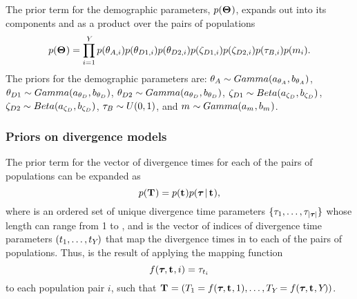 \begin{linenomath}
The prior term for the demographic parameters, $p(\mathbf{\Theta_{}})$,
expands out into its components and as a product over the \npairs{}
pairs of populations
\begin{equation}
    p(\demographicParamVector) =
    \prod_{i=1}^{\npairs{}}
    p(\ancestralTheta{i})
    p(\descendantTheta{1}{i})
    p(\descendantTheta{2}{i})
    p(\bottleScalar{1}{i})
    p(\bottleScalar{2}{i})
    p(\bottleTime{i})
    p(\migrationRate{i}).
    \label{eq:demographicPrior}
\end{equation}
The priors for the demographic parameters are:
$\ancestralTheta{} \sim Gamma(\gammaShape{\ancestralTheta{}},
\gammaScale{\ancestralTheta{}})$,
$\descendantTheta{1}{} \sim Gamma(\gammaShape{\descendantTheta{}{}},
\gammaScale{\descendantTheta{}{}})$,
$\descendantTheta{2}{} \sim Gamma(\gammaShape{\descendantTheta{}{}},
\gammaScale{\descendantTheta{}{}})$,
$\bottleScalar{1}{} \sim Beta(\betaA{\bottleScalar{}{}},
\betaB{\bottleScalar{}{}})$,
$\bottleScalar{2}{} \sim Beta(\betaA{\bottleScalar{}{}},
\betaB{\bottleScalar{}{}})$,
$\bottleTime{} \sim U(0, 1)$,
and
$m_{} \sim Gamma(a_{m_{}},
b_{m_{}})$.
\end{linenomath}

\subsubsection*{Priors on divergence models}
\begin{linenomath}
The prior term for the vector of divergence times for each of
the \npairs{} pairs of populations can be expanded as
\begin{equation}
    p(\mathbf{T_{}}) = p(\mathbf{t_{}})p(\boldsymbol{\tau_{}} \,|\, \mathbf{t_{}}),
    \label{eq:divModelPrior}
\end{equation}
where \divTimeVector is an ordered set of unique divergence time parameters
$\{\tau_{1}, \ldots, \tau_{\lvert \boldsymbol{\tau_{}} \rvert}\}$ whose length
\divTimeNum can range from 1 to \npairs{},
and \divTimeIndexVector is the vector of indices of divergence time parameters 
$(t_{1}, \ldots, t_{Y_{}})$
that map the divergence times in \divTimeVector to each of the \npairs{}
pairs of populations.
Thus, \divTimeMapVector is the result of applying the mapping function
\begin{equation}
    f(\boldsymbol{\tau_{}}, \mathbf{t_{}}, i) = \tau_{t_{i}}
    \label{eq:divTimeMapFunction}
\end{equation}
to each population pair $i$, such that
$\mathbf{T_{}} = (T_{1} = f(\boldsymbol{\tau_{}}, \mathbf{t_{}},
1), \ldots, T_{Y_{}} = f(\boldsymbol{\tau_{}}, \mathbf{t_{}},
Y_{}))$.
\end{linenomath}

